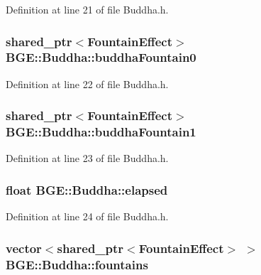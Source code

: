 Definition at line 21 of file Buddha.\-h.

\hypertarget{class_b_g_e_1_1_buddha_accce50bbdd57a213a4bc4037d5d0fc63}{
\subsubsection[{buddha\-Fountain0}]{\setlength{\rightskip}{0pt plus 5cm}shared\-\_\-ptr$<${\bf Fountain\-Effect}$>$ B\-G\-E\-::\-Buddha\-::buddha\-Fountain0}}\label{class_b_g_e_1_1_buddha_accce50bbdd57a213a4bc4037d5d0fc63}


Definition at line 22 of file Buddha.\-h.

\hypertarget{class_b_g_e_1_1_buddha_ad489543277af0eea9477cfd1fc51f688}{
\subsubsection[{buddha\-Fountain1}]{\setlength{\rightskip}{0pt plus 5cm}shared\-\_\-ptr$<${\bf Fountain\-Effect}$>$ B\-G\-E\-::\-Buddha\-::buddha\-Fountain1}}\label{class_b_g_e_1_1_buddha_ad489543277af0eea9477cfd1fc51f688}


Definition at line 23 of file Buddha.\-h.

\hypertarget{class_b_g_e_1_1_buddha_a504991853d9871d15c542797debe7e46}{
\subsubsection[{elapsed}]{\setlength{\rightskip}{0pt plus 5cm}float B\-G\-E\-::\-Buddha\-::elapsed}}\label{class_b_g_e_1_1_buddha_a504991853d9871d15c542797debe7e46}


Definition at line 24 of file Buddha.\-h.

\hypertarget{class_b_g_e_1_1_buddha_a987cf13713d95429d6e2a7d0152fd89f}{
\subsubsection[{fountains}]{\setlength{\rightskip}{0pt plus 5cm}vector$<$shared\-\_\-ptr$<${\bf Fountain\-Effect}$>$ $>$ B\-G\-E\-::\-Buddha\-::fountains}}\label{class_b_g_e_1_1_buddha_a987cf13713d95429d6e2a7d0152fd89f}



